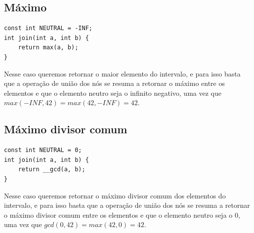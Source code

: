 \subsection{Máximo}
\begin{lstlisting}
const int NEUTRAL = -INF;
int join(int a, int b) {
    return max(a, b);
}
\end{lstlisting}

Nesse caso queremos retornar o maior elemento do intervalo, e para isso basta que a operação de união dos nós se resuma a retornar o máximo entre os elementos e que o elemento neutro seja o infinito negativo, uma vez que $max(-INF, 42) = max(42, -INF) = 42$.

\subsection{Máximo divisor comum}
\begin{lstlisting}
const int NEUTRAL = 0;
int join(int a, int b) {
    return __gcd(a, b);
}
\end{lstlisting}
Nesse caso queremos retornar o máximo divisor comum dos elementos do intervalo, e para isso basta que a operação de união dos nós se resuma a retornar o máximo divisor comum entre os elementos e que o elemento neutro seja o $0$, uma vez que $gcd(0, 42) = max(42, 0) = 42$.
